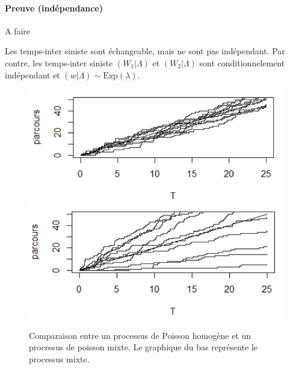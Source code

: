 \paragraph{Preuve (indépendance)}
A faire

\begin{note}
    Les temps-inter siniste sont échangeable, mais ne sont pas indépendant. Par contre,
    les temps-inter siniste $(W_1|\Lambda)$ et $(W_2|\Lambda)$ sont conditionnelement indépendant et $(w|\Lambda) \sim \text{Exp}(\lambda)$. \\
\end{note}

\begin{figure}[!ht]
    \centering
    \includegraphics[scale=0.5]{src/TheorieDuRisque/SimulationProcessusPoisson.png}
    \includegraphics[scale=0.5]{src/TheorieDuRisque/SimulationProcessusPoissonMixte.png}
    \caption{Comparaison entre un processus de Poisson homogène et un processus de poisson mixte. Le graphique du bas représente le processus mixte.}
\end{figure}

